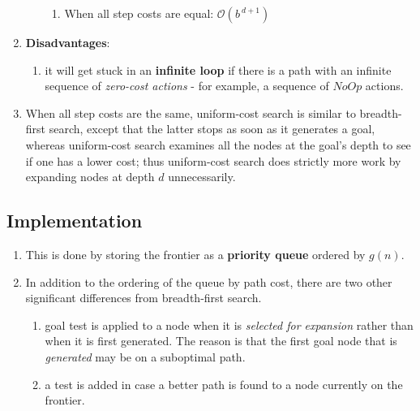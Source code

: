\begin{enumerate}[itemsep=0.2cm]
\begin{enumerate}[itemsep=0.2cm]
\begin{enumerate}[itemsep=0.2cm]
            \item When all step costs are equal: $\mathcal{O}(b^{\ d+1})$
            \hfill \cite{ai/book/Artificial-Intelligence-A-Modern-Approach/Russell-Norvig}
        \end{enumerate}
    \end{enumerate}

    \item \textbf{Disadvantages}:
    \begin{enumerate}[itemsep=0.2cm]
        \item it will get stuck in an \textbf{infinite loop} if there is a path with an infinite sequence of \textit{zero-cost actions} - for example, a sequence of $NoOp$ actions.
        \hfill \cite{ai/book/Artificial-Intelligence-A-Modern-Approach/Russell-Norvig}
    \end{enumerate}

    \item When all step costs are the same, uniform-cost search is similar to breadth-first search, except that the latter stops as soon as it generates a goal, whereas uniform-cost search examines all the nodes at the goal’s depth to see if one has a lower cost; thus uniform-cost search does strictly more work by expanding nodes at depth $d$ unnecessarily.
    \hfill \cite{ai/book/Artificial-Intelligence-A-Modern-Approach/Russell-Norvig}
\end{enumerate}




\subsection*{Implementation}

\begin{enumerate}
    \item  This is done by storing the frontier as a \textbf{priority queue} ordered by $g(n)$. 
    \hfill \cite{ai/book/Artificial-Intelligence-A-Modern-Approach/Russell-Norvig}

    \item In addition to the ordering of the queue by path cost, there are two other significant differences from breadth-first search.
    \hfill \cite{ai/book/Artificial-Intelligence-A-Modern-Approach/Russell-Norvig}
    \begin{enumerate}
        \item  goal test is applied to a node when it is \textit{selected for expansion} rather than when it is first generated.
        The reason is that the first goal node that is \textit{generated} may be on a suboptimal path.
        \hfill \cite{ai/book/Artificial-Intelligence-A-Modern-Approach/Russell-Norvig}

        \item a test is added in case a better path is found to a node currently on the frontier.
        \hfill \cite{ai/book/Artificial-Intelligence-A-Modern-Approach/Russell-Norvig}
    \end{enumerate}

\end{enumerate}

